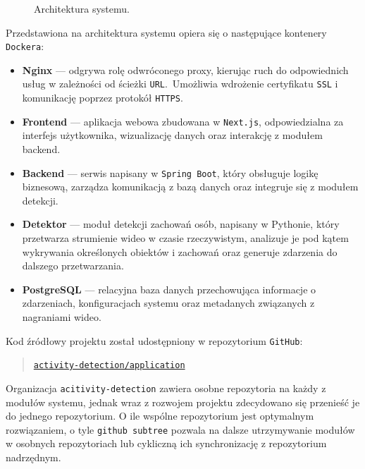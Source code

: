 \begin{figure}
    \caption{Architektura systemu.}\label{fig:architektura_systemu}
\end{figure}

Przedstawiona na  architektura systemu opiera się o następujące kontenery \texttt{Dockera}: 
\begin{itemize}
\item \textbf{Nginx} --- odgrywa rolę odwróconego proxy, kierując ruch do odpowiednich usług w zależności od ścieżki \texttt{URL}.\ Umożliwia wdrożenie certyfikatu \texttt{SSL} i komunikację poprzez protokół \texttt{HTTPS}.
\item \textbf{Frontend} --- aplikacja webowa zbudowana w \texttt{Next.js}, odpowiedzialna za interfejs użytkownika, wizualizację danych oraz interakcję z modułem backend.
\item \textbf{Backend} --- serwis napisany w \texttt{Spring Boot}, który obsługuje logikę biznesową, zarządza komunikacją z bazą danych oraz integruje się z modułem detekcji.
\item \textbf{Detektor} --- moduł detekcji zachowań osób, napisany w Pythonie, który przetwarza strumienie wideo w czasie rzeczywistym, analizuje je pod kątem wykrywania określonych obiektów i zachowań oraz generuje zdarzenia do dalszego przetwarzania.
\item \textbf{PostgreSQL} --- relacyjna baza danych przechowująca informacje o zdarzeniach, konfiguracjach systemu oraz metadanych związanych z nagraniami wideo.
\end{itemize}

Kod źródłowy projektu został udostępniony w repozytorium \texttt{GitHub}: 
\begin{quote}
    \href{https://github.com/activity-detection/application}{\texttt{activity-detection/application}}
\end{quote}
Organizacja \texttt{acitivity-detection} zawiera osobne repozytoria na każdy z modułów systemu, jednak wraz z rozwojem projektu zdecydowano się przenieść je do jednego repozytorium. O ile wspólne repozytorium jest optymalnym rozwiązaniem, o tyle \texttt{github subtree} pozwala na dalsze utrzymywanie modułów w osobnych repozytoriach lub cykliczną ich synchronizację z repozytorium nadrzędnym.